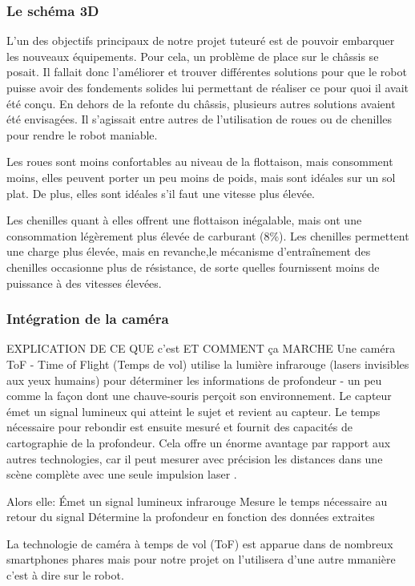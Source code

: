 \documentclass{PackagerQualityN}
\begin{document}
\subsubsection{Le schéma 3D}
L’un des objectifs principaux de notre projet tuteuré est de pouvoir embarquer les nouveaux équipements. Pour cela, un problème de place sur le châssis se posait. Il fallait donc l’améliorer et trouver différentes solutions pour que le robot puisse avoir des fondements solides lui permettant de réaliser ce pour quoi il avait été conçu. 
En dehors de la refonte du châssis, plusieurs autres solutions avaient été envisagées. Il s’agissait entre autres de l’utilisation de roues ou de chenilles pour rendre le robot maniable.

Les roues sont moins confortables au niveau de la flottaison, mais consomment moins, elles peuvent porter un peu moins de poids, mais sont idéales sur un sol plat. De plus, elles sont idéales s’il faut une vitesse plus élevée.

Les chenilles quant à elles offrent une flottaison inégalable, mais ont une consommation légèrement plus élevée de carburant (8\%). Les chenilles permettent une charge plus élevée, mais en revanche,le mécanisme d’entraînement des chenilles occasionne plus de résistance, de sorte quelles fournissent moins de puissance à des vitesses élevées.

\subsubsection{Intégration de la caméra}

EXPLICATION DE CE QUE c'est ET COMMENT ça MARCHE 
Une caméra ToF - Time of Flight (Temps de vol) utilise la lumière infrarouge (lasers invisibles aux yeux humains) pour déterminer les informations de profondeur - un peu comme la façon dont une chauve-souris perçoit son environnement. Le capteur émet un signal lumineux qui atteint le sujet et revient au capteur. Le temps nécessaire pour rebondir est ensuite mesuré et fournit des capacités de cartographie de la profondeur. Cela offre un énorme avantage par rapport aux autres technologies, car il peut mesurer avec précision les distances dans une scène complète avec une seule impulsion laser .

Alors elle:
Émet un signal lumineux infrarouge
Mesure le temps nécessaire au retour du signal
Détermine la profondeur en fonction des données extraites

La technologie de caméra à temps de vol (ToF) est apparue dans de nombreux smartphones phares  mais pour notre projet on l'utilisera d'une autre mmanière c'est à dire sur le robot.
\end{document}
